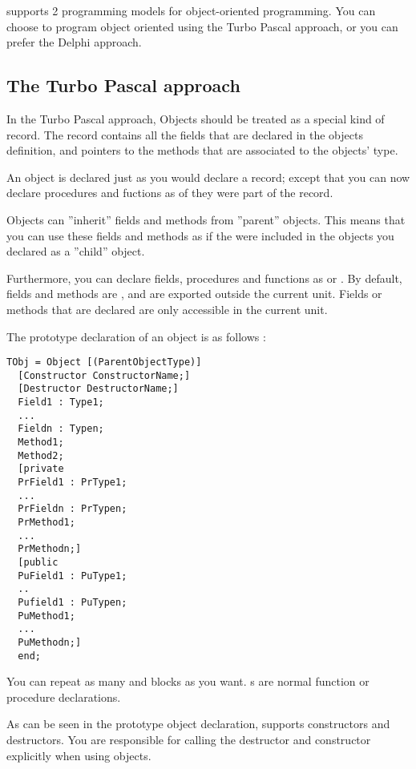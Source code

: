 \documentclass{report}
\begin{document}
\fpk supports 2 programming models for object-oriented programming.
You can choose to program object oriented using the Turbo Pascal approach,
or you can prefer the Delphi approach.

\subsection{The Turbo Pascal approach}
In the Turbo Pascal approach, Objects should be treated as a special kind of
record. The record contains all the fields that are declared in the objects
definition, and pointers to the methods that are associated to the objects'
type.

An object is declared just as you would declare a record; except that you
can now declare procedures and fuctions as of they were part of the record.

Objects can ''inherit'' fields and methods from ''parent'' objects. This means
that you can use these fields and methods as if the were included in the
objects you declared as a ''child'' object. 

Furthermore, you can declare fields, procedures and functions as 
or . By default, fields and methods are , and are
exported outside the current unit. Fields or methods that are declared
 are only accessible in the current unit.

The prototype declaration of an object is as follows :
\begin{verbatim}
TObj = Object [(ParentObjectType)]
  [Constructor ConstructorName;]
  [Destructor DestructorName;]
  Field1 : Type1;
  ...
  Fieldn : Typen;
  Method1;
  Method2;
  [private
  PrField1 : PrType1;
  ...
  PrFieldn : PrTypen;
  PrMethod1;
  ...
  PrMethodn;]
  [public
  PuField1 : PuType1;
  ..
  Pufield1 : PuTypen;
  PuMethod1;
  ...
  PuMethodn;]
  end;
\end{verbatim}
You can repeat as many  and  blocks as you want.
s are normal function or procedure declarations. 

As can be seen in the prototype object declaration, \fpk supports
constructors and destructors. You are responsible for calling the 
destructor and constructor explicitly when using objects.
\end{document}
